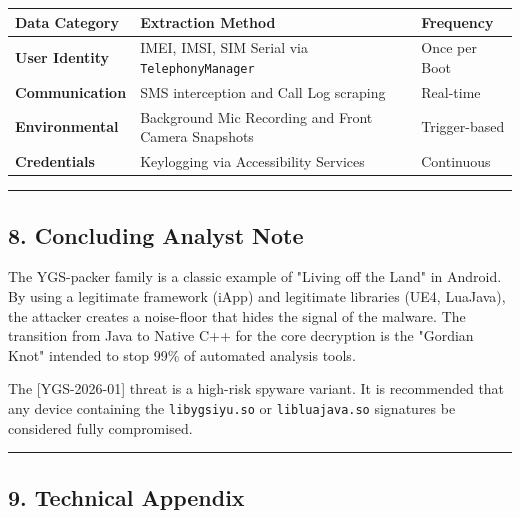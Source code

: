 \documentclass[
]{article}
\begin{document}
\begin{longtable}[]{@{}lll@{}}
\toprule\noalign{}
Data Category & Extraction Method & Frequency \\
\midrule\noalign{}
\endhead
\bottomrule\noalign{}
\endlastfoot
\textbf{User Identity} & IMEI, IMSI, SIM Serial via
\texttt{TelephonyManager} & Once per Boot \\
\textbf{Communication} & SMS interception and Call Log scraping &
Real-time \\
\textbf{Environmental} & Background Mic Recording and Front Camera
Snapshots & Trigger-based \\
\textbf{Credentials} & Keylogging via Accessibility Services &
Continuous \\
\end{longtable}

\begin{center}\rule{0.5\linewidth}{0.5pt}\end{center}

\subsection{\texorpdfstring{\textbf{8. Concluding Analyst
Note}}{8. Concluding Analyst Note}}\label{8-concluding-analyst-note}

The YGS-packer family is a classic example of "Living off the Land" in
Android. By using a legitimate framework (iApp) and legitimate libraries
(UE4, LuaJava), the attacker creates a noise-floor that hides the signal
of the malware. The transition from Java to Native C++ for the core
decryption is the "Gordian Knot" intended to stop 99\% of automated
analysis tools.

The {[}YGS-2026-01{]} threat is a high-risk spyware variant. It is
recommended that any device containing the \texttt{libygsiyu.so} or
\texttt{libluajava.so} signatures be considered fully compromised.

\begin{center}\rule{0.5\linewidth}{0.5pt}\end{center}

\subsection{\texorpdfstring{\textbf{9. Technical
Appendix}}{9. Technical Appendix}}\label{9-technical-appendix}
\end{document}
